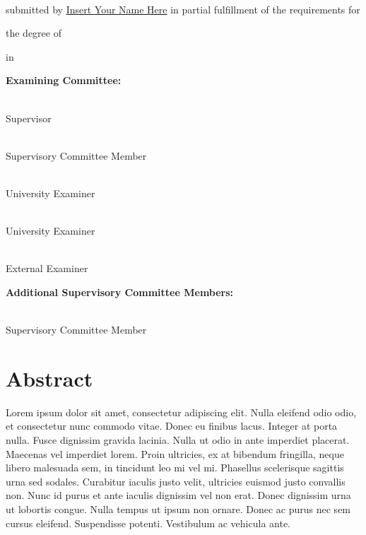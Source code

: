 \documentclass[
]{article}
\begin{document}
\vspace{5mm}

\noindent\underline{}\\
\vspace{2mm}

submitted by \underline{Insert Your Name Here} in partial fulfillment of the requirements for

the degree of \noindent\underline{}

in \noindent\underline{}

\vspace{5mm}

\textbf{Examining Committee:}

\noindent\underline{}\\
Supervisor

\noindent\underline{}\\
Supervisory Committee Member

\noindent\underline{}\\
University Examiner

\noindent\underline{}\\
University Examiner

\noindent\underline{}\\
External Examiner

\textbf{Additional Supervisory Committee Members:}

\noindent\underline{}\\
Supervisory Committee Member

\clearpage

\setlength{\parindent}{4em} 
\linespread{1}
\doublespacing

\section*{Abstract}

Lorem ipsum dolor sit amet, consectetur adipiscing elit. Nulla eleifend odio odio, et consectetur nunc commodo vitae. Donec eu finibus lacus. Integer at porta nulla. Fusce dignissim gravida lacinia. Nulla ut odio in ante imperdiet placerat. Maecenas vel imperdiet lorem. Proin ultricies, ex at bibendum fringilla, neque libero malesuada sem, in tincidunt leo mi vel mi. Phasellus scelerisque sagittis urna sed sodales. Curabitur iaculis justo velit, ultricies euismod justo convallis non. Nunc id purus et ante iaculis dignissim vel non erat. Donec dignissim urna ut lobortis congue. Nulla tempus ut ipsum non ornare. Donec ac purus nec sem cursus eleifend. Suspendisse potenti. Vestibulum ac vehicula ante.
\end{document}
